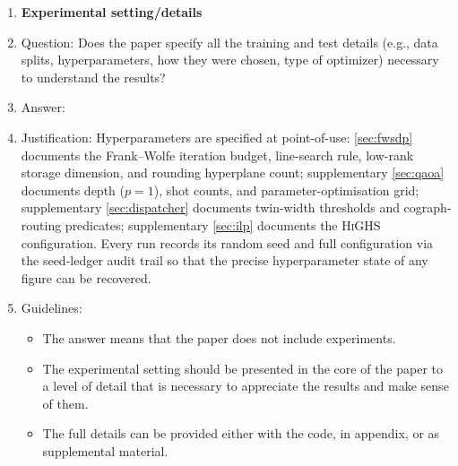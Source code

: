 \begin{enumerate}
\item {\bf Experimental setting/details}
    \item[] Question: Does the paper specify all the training and test details (e.g., data splits, hyperparameters, how they were chosen, type of optimizer) necessary to understand the results?
    \item[] Answer: \answerYes{} %
    \item[] Justification: Hyperparameters are specified at point-of-use:
        \cref{sec:fwsdp} documents the Frank--Wolfe iteration budget,
        line-search rule, low-rank storage dimension, and rounding
        hyperplane count; supplementary \cref{sec:qaoa} documents \QAOA
        depth ($p{=}1$), shot counts, and parameter-optimisation grid;
        supplementary \cref{sec:dispatcher} documents twin-width
        thresholds and cograph-routing predicates; supplementary
        \cref{sec:ilp} documents the \textsc{HiGHS} \MILP configuration.
        Every run records its random seed and full configuration via the
        seed-ledger audit trail so that the precise hyperparameter state
        of any figure can be recovered.
    \item[] Guidelines:
    \begin{itemize}
        \item The answer \answerNA{} means that the paper does not include experiments.
        \item The experimental setting should be presented in the core of the paper to a level of detail that is necessary to appreciate the results and make sense of them.
        \item The full details can be provided either with the code, in appendix, or as supplemental material.
    \end{itemize}


\end{enumerate}
